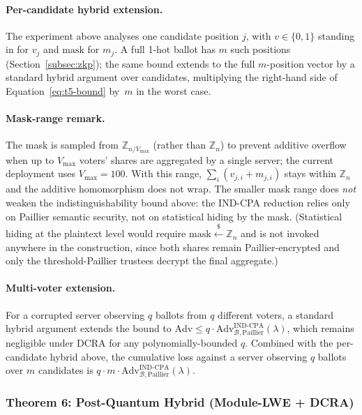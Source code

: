 \paragraph{Per-candidate hybrid extension.} The experiment above analyses one candidate position $j$, with $v \in \{0,1\}$ standing in for $v_j$ and $\mathrm{mask}$ for $m_j$. A full 1-hot ballot has $m$ such positions (Section~\ref{subsec:zkp}); the same bound extends to the full $m$-position vector by a standard hybrid argument over candidates, multiplying the right-hand side of Equation~\eqref{eq:t5-bound} by~$m$ in the worst case.

\paragraph{Mask-range remark.} The mask is sampled from $\mathbb{Z}_{n / V_{\max}}$ (rather than $\mathbb{Z}_n$) to prevent additive overflow when up to $V_{\max}$ voters' shares are aggregated by a single server; the current deployment uses $V_{\max} = 100$. With this range, $\sum_{i} (v_{j,i} + m_{j,i})$ stays within $\mathbb{Z}_n$ and the additive homomorphism does not wrap. The smaller mask range does \emph{not} weaken the indistinguishability bound above: the IND-CPA reduction relies only on Paillier semantic security, not on statistical hiding by the mask. (Statistical hiding at the plaintext level would require $\mathrm{mask} \stackrel{\$}{\leftarrow} \mathbb{Z}_n$ and is not invoked anywhere in the construction, since both shares remain Paillier-encrypted and only the threshold-Paillier trustees decrypt the final aggregate.)

\paragraph{Multi-voter extension.} For a corrupted server observing $q$ ballots from $q$ different voters, a standard hybrid argument extends the bound to $\mathrm{Adv} \leq q \cdot \mathrm{Adv}^{\mathrm{IND\text{-}CPA}}_{\mathcal{B}, \mathrm{Paillier}}(\lambda)$, which remains negligible under DCRA for any polynomially-bounded $q$. Combined with the per-candidate hybrid above, the cumulative loss against a server observing $q$ ballots over $m$ candidates is $q \cdot m \cdot \mathrm{Adv}^{\mathrm{IND\text{-}CPA}}_{\mathcal{B}, \mathrm{Paillier}}(\lambda)$.

\subsubsection{Theorem 6: Post-Quantum Hybrid (Module-LWE + DCRA)}
\label{subsubsec:t6-pq-hybrid}

